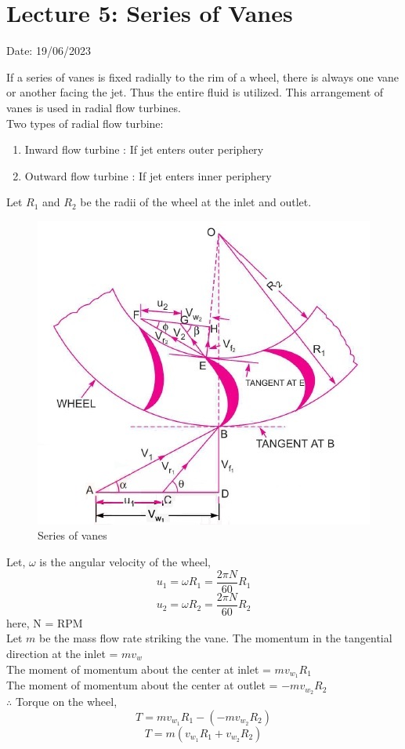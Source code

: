 \documentclass{article}
\begin{document}
\section{Lecture 5: Series of Vanes}
\hfill Date: 19/06/2023

If a series of vanes is fixed radially to the rim of a wheel, there is always one vane or another facing the jet. Thus the entire fluid is utilized. This arrangement of vanes is used in radial flow turbines.\\

Two types of radial flow turbine: 
\begin{enumerate}
  \item Inward flow turbine : If jet enters outer periphery
  \item Outward flow turbine : If jet enters inner periphery
\end{enumerate}

Let $R_1$ and $R_2$ be the radii of the wheel at the inlet and outlet.

\begin{figure}[h]
  \begin{center}
  \includegraphics[width=0.8\linewidth]{img/series_vane.jpg}
    \caption{Series of vanes}
\end{center}
\end{figure}

Let, $\omega$ is the angular velocity of the wheel,
$$u_1 = \omega R_1 = \frac{2 \pi N}{60} R_1$$
$$u_2 = \omega R_2 = \frac{2 \pi N}{60} R_2$$
here, N = RPM \\
Let $m$ be the mass flow rate striking the vane. The momentum in the tangential direction at the inlet = $mv_w$ \\
The moment of momentum about the center at inlet = $mv_{w_1}R_1$\\
The moment of momentum about the center at outlet = $-mv_{w_2}R_2$\\
$\therefore$ Torque on the wheel,
$$T = mv_{w_1}R_1 - \left(-mv_{w_2}R_2\right)$$
\begin{equation}
  T = m \left(v_{w_1}R_1 + v_{w_2}R_2\right) \label{eq:eq28}
\end{equation}
\end{document}
